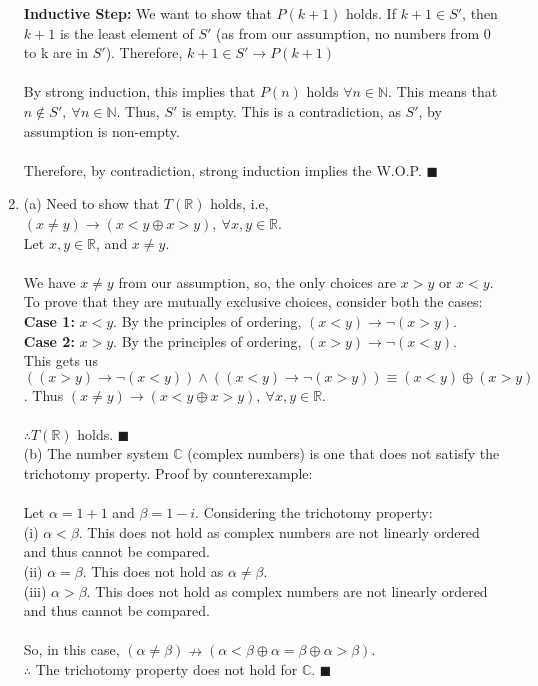 \documentclass[a4paper]{article}
\begin{document}
\begin{enumerate}
\textbf{Inductive Step:} We want to show that $P(k+1)$ holds. If $k+1 \in S'$, then $k+1$ is the least element of $S'$ (as from our assumption, no numbers from 0 to k are in $S'$). Therefore, $k+1 \in S' \rightarrow P(k+1)$\\
\\
By strong induction, this implies that $P(n)$ holds $\forall n \in \mathbb{N}$. This means that $n \notin S',\ \forall n \in \mathbb{N}$. Thus, $S'$ is empty. This is a contradiction, as $S'$, by assumption is non-empty.\\
\\
Therefore, by contradiction, strong induction implies the W.O.P. $\blacksquare$

\item (a) Need to show that $T(\mathbb{R})$ holds, i.e, $(x\neq y)\rightarrow (x < y \oplus x > y),\ \forall x, y \in \mathbb{R}$.\\
Let $x, y \in \mathbb{R}$, and $x \neq y$. \\
\\
We have $x \neq y$ from our assumption, so, the only choices are $x > y$ or $x < y$. To prove that they are mutually exclusive choices, consider both the cases:\\
\textbf{Case 1:} $x < y$. By the principles of ordering, $(x < y) \rightarrow \neg(x > y)$.\\
\textbf{Case 2:} $x > y$. By the principles of ordering, $(x > y) \rightarrow \neg(x < y)$.\\

This gets us $((x > y) \rightarrow \neg(x < y)) \land ((x < y) \rightarrow \neg(x > y)) \equiv (x < y) \oplus (x > y)$. Thus $(x\neq y) \rightarrow (x < y \oplus x > y),\ \forall x, y \in \mathbb{R}$.\\
\\
$\therefore T(\mathbb{R})$ holds. $\blacksquare$
\vspace{0.5in}\\
(b) The number system $\mathbb{C}$ (complex numbers) is one that does not satisfy the trichotomy property. Proof by counterexample:\\
\\
Let $\alpha = 1 + 1$ and $\beta = 1 - i$. Considering the trichotomy property:\\
(i) $\alpha < \beta$. This does not hold as complex numbers are not linearly ordered and thus cannot be compared.\\
(ii) $\alpha = \beta$. This does not hold as $\alpha \neq \beta$.\\
(iii) $\alpha > \beta$. This does not hold as complex numbers are not linearly ordered and thus cannot be compared.\\
\\
So, in this case, $(\alpha \neq \beta) \nrightarrow (\alpha < \beta \oplus \alpha = \beta \oplus \alpha > \beta)$.\\
$\therefore$ The trichotomy property does not hold for $\mathbb{C}$. $\blacksquare$\\


\end{enumerate}
\end{document}
